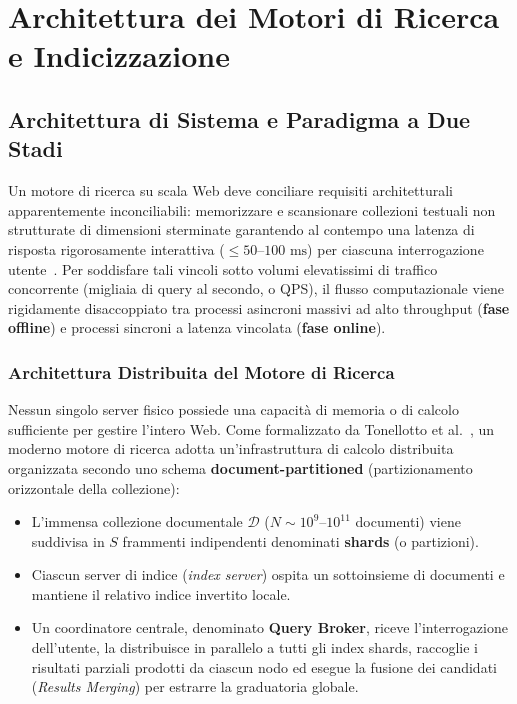 \chapter{Architettura dei Motori di Ricerca e Indicizzazione}
\label{chap:indicizzazione-query-processing}

\FloatBarrier
\section{Architettura di Sistema e Paradigma a Due Stadi}
\label{sec:architettura-due-stadi}

Un motore di ricerca su scala Web deve conciliare requisiti architetturali apparentemente inconciliabili: memorizzare e scansionare collezioni testuali non strutturate di dimensioni sterminate garantendo al contempo una latenza di risposta rigorosamente interattiva ($\le 50\text{--}100\text{ ms}$) per ciascuna interrogazione utente~\cite{tonellotto2018}. Per soddisfare tali vincoli sotto volumi elevatissimi di traffico concorrente (migliaia di query al secondo, o QPS), il flusso computazionale viene rigidamente disaccoppiato tra processi asincroni massivi ad alto throughput (\textbf{fase offline}) e processi sincroni a latenza vincolata (\textbf{fase online}).

\FloatBarrier
\subsection{Architettura Distribuita del Motore di Ricerca}
\label{subsec:architettura-distribuita}
Nessun singolo server fisico possiede una capacit\`a di memoria o di calcolo sufficiente per gestire l'intero Web. Come formalizzato da Tonellotto et al.~\cite{tonellotto2018}, un moderno motore di ricerca adotta un'infrastruttura di calcolo distribuita organizzata secondo uno schema \textbf{document-partitioned} (partizionamento orizzontale della collezione):
\begin{itemize}
    \item L'immensa collezione documentale $\mathcal{D}$ ($N \sim 10^9\text{--}10^{11}$ documenti) viene suddivisa in $S$ frammenti indipendenti denominati \textbf{shards} (o partizioni).
    \item Ciascun server di indice (\textit{index server}) ospita un sottoinsieme di documenti e mantiene il relativo indice invertito locale.
    \item Un coordinatore centrale, denominato \textbf{Query Broker}, riceve l'interrogazione dell'utente, la distribuisce in parallelo a tutti gli index shards, raccoglie i risultati parziali prodotti da ciascun nodo ed esegue la fusione dei candidati (\textit{Results Merging}) per estrarre la graduatoria globale.
\end{itemize}

